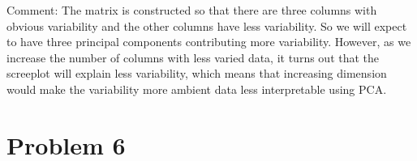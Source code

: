 \documentclass{article}\usepackage[]{graphicx}\usepackage[]{color}
\newenvironment{knitrout}{}{} %
\begin{document}
\begin{knitrout}
{}



\end{knitrout}

Comment: The matrix is constructed so that there are three columns with obvious variability and the other columns have less variability. So we will expect to have three principal components contributing more variability. However, as we increase the number of columns with less varied data, it turns out that the screeplot will explain less variability, which means that increasing dimension would make the variability more ambient data less interpretable using PCA.

\section*{Problem 6}
\end{document}
